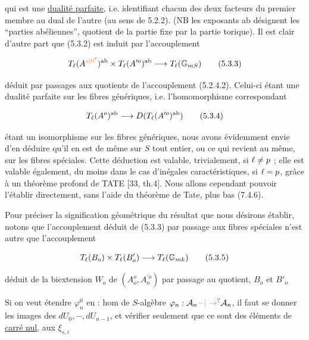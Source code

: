 qui est une \uline{dualité parfaite}, i.e. identifiant chacun des deux facteurs du premier membre au dual de l'autre (au sens de 5.2.2). (NB les exposants ab désignent les ``parties abéliennes'', quotient de la partie fixe par la partie torique). Il est clair d'autre part que (5.3.2) est induit par l'accouplement

\[
T_{\handwritten{\ell}}(A^{\unsure{o|0}})^{\mathrm{ab}}\times T_{\handwritten{\ell}}(A^{\prime o})^{\mathrm{ab}}\handwritten{\longrightarrow} T_{\handwritten{\ell}}(\mathbb{G}_{mS})\tag*{(5.3.3)}
\]

déduit par passages aux quotients de l'accouplement (5.2.4.2). Celui-ci étant une dualité parfaite sur les fibres génériques, i.e. l'homomorphisme correspondant

\[
T_{\ell}(A^o)^{\mathrm{ab}}\longrightarrow D(T_{\ell}(A^{\prime o})^{\mathrm{ab}})\tag*{(5.3.4)}
\]

étant un isomorphisme sur les fibres génériques, nous avons évidemment envie d'en déduire qu'il en est de même sur $S$ tout entier, ou ce qui revient au même, sur les fibres spéciales. Cette déduction est valable, trivialement, si $\ell\ne p$ ; elle est valable également, du moins dans le cas d'inégales caractéristiques, si $\ell=p$, grâce à un théorème profond de TATE [33, th.4]. Nous allons cependant pouvoir l'établir directement, sans l'aide du théorème de Tate, plus bas (7.4.6).

Pour préciser la signification géométrique du résultat que nous désirons établir, notons que l'accouplement déduit de (5.3.3) par passage aux fibres spéciales n'est autre que l'accouplement

\[
T_{\ell}(B_o)\times T_{\ell}(B'_o)\longrightarrow T_{\ell}(\mathbb{G}_{mk})\tag*{(5.3.5)}
\]

déduit de la biextension $W_o$ de $(A_o^o,A^{\prime o}_o)$ par passage au quotient, $B_o$ et $B'_o$



Si on veut étendre $\varphi_n^0$ en  : hom de $S$-algèbre $\varphi_n:\mathcal A_n\unsure{-|\to}\mathcal A_n$, il faut se donner les images des $dU_0,-,dU_{n-1}$, et vérifier seulement que ce sont des éléments de \uline{carré nul},   aux $\xi_{s,i}$

